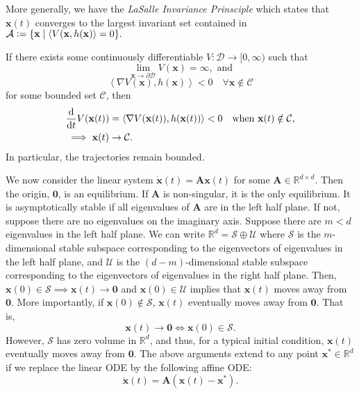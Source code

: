 More generally, we have the \emph{LaSalle Invariance Prinsciple} which states that $\mathbf{x}(t)$ converges to the largest invariant set contained in $\mathcal{A} \vcentcolon= \{\mathbf{x} \mid \left\langle V(\mathbf{x}, h(\mathbf{x}) \right\rangle = 0 \}.$

If there exists some continuously differentiable $V \colon \mathcal{D} \to [0,\infty)$ such that
\[
    \lim_{\mathbf{x} \to \partial \mathcal{D}} V(\mathbf{x}) = \infty, \text{ and}
\]
\[
    \left\langle \nabla V(\mathbf{x}), h(\mathbf{x})\right\rangle < 0 \quad \forall \mathbf{x} \notin \mathcal{C}
\]
for some bounded set $\mathcal{C}$, then
\begin{align*}
    &\frac{\mathrm{d}}{\mathrm{d} t}V(\mathbf{x}(t)) = \left\langle \nabla V(\mathbf{x}(t)), h(\mathbf{x}(t))\right\rangle < 0 \quad \text{when }\mathbf{x}(t) \notin \mathcal{C}, \\
    &\implies \mathbf{x}(t) \to \mathcal{C}.
\end{align*}
In particular, the trajectories remain bounded. 

\medskip

We now consider the linear system $\dot{\mathbf{x}}(t) = \mathbf{Ax}(t)$ for some $\mathbf{A} \in \mathbb{R}^{d \times d}$. Then the origin, $\mathbf{0}$, is an equilibrium. If $\mathbf{A}$ is non-singular, it is the only equilibrium. It is asymptotically stable if all eigenvalues of $\mathbf{A}$ are in the left half plane. If not, suppose there are no eigenvalues on the imaginary axis. Suppose there are $m < d$ eigenvalues in the left half plane. We can write $\mathbb{R}^d = \mathcal{S} \oplus \mathcal{U}$ where $\mathcal{S}$ is the $m$-dimensional stable subspace corresponding to the eigenvectors of eigenvalues in the left half plane, and $\mathcal{U}$ is the $(d-m)$-dimensional stable subspace corresponding to the eigenvectors of eigenvalues in the right half plane. Then, $\mathbf{x}(0) \in \mathcal{S} \implies \mathbf{x}(t) \to \mathbf{0}$ and $\mathbf{x}(0) \in \mathcal{U}$ implies that $\mathbf{x}(t)$ moves away from $\mathbf{0}$. More importantly, if $\mathbf{x}(0) \notin \mathcal{S}$, $\mathbf{x}(t)$ eventually moves away from $\mathbf{0}$. That is,
\[
    \mathbf{x}(t) \to \mathbf{0} \iff \mathbf{x}(0) \in \mathcal{S}.
\]  
However, $\mathcal{S}$ has zero volume in $\mathbb{R}^d$, and thus, for a typical initial condition, $\mathbf{x}(t)$ eventually moves away from $\mathbf{0}$. The above arguments extend to any point $\mathbf{x}^* \in\mathbb{R}^d$ if we replace the linear ODE by the following affine ODE:
\[
    \dot{\mathbf{x}}(t) = \mathbf{A}\left( \mathbf{x}(t) - \mathbf{x}^* \right).
\]

